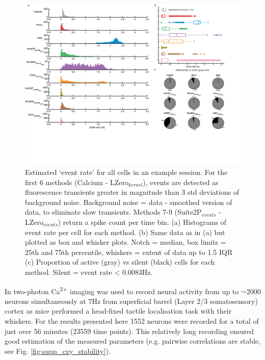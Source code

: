 \documentclass[a4paper,10pt,twocolumn]{article}
\begin{document}
\begin{figure}
\includegraphics[trim={0 85 40 0},clip,width=\textwidth]{full_figs/why_deconvolve_F3_3.png}
\caption{\label{fig:simple_stats} Estimated `event rate' for all cells in an example session. For the first 6 methods (Calcium - LZero$_{kernel}$), events are detected as fluorescence transients greater in magnitude than 3 std deviations of background noise. Background noise = data - smoothed version of data, to eliminate slow transients. Methods 7-9 (Suite2P$_{events}$ - LZero$_{events}$) return a spike count per time bin. (a) Histograms of event rate per cell for each method. (b) Same data as in (a) but plotted as box and whisker plots. Notch = median, box limits = 25th and 75th percentile, whiskers = extent of data up to 1.5 IQR (c) Proportion of active (gray) vs silent (black) cells for each method. Silent = event rate < 0.0083Hz.}
\end{figure}

In \citealt{Peron2015-qz} two-photon Ca\textsuperscript{2+} imaging was used to record neural activity from up to $\sim$2000 neurons simultaneously at 7Hz from superficial barrel (Layer 2/3 somatosensory) cortex as mice performed a head-fixed tactile localisation task with their whiskers. For the results presented here 1552 neurons were recorded for a total of just over 56 minutes (23559 time points). This relatively long recording ensured good estimation of the measured parameters (e.g. pairwise correlations are stable, see Fig. \ref{fig:supp_cxy_stability}).


\end{document}

